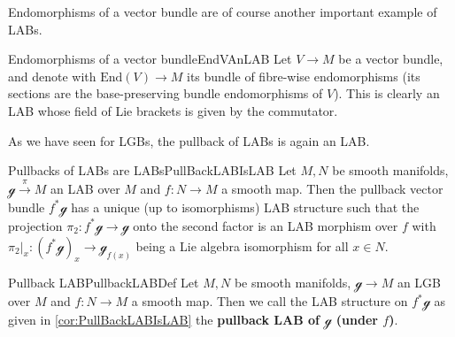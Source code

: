 \documentclass[reqno,a4paper,oneside]{amsart}
\theoremstyle{plain}
\theoremstyle{remark}
\theoremstyle{definition}
\begin{document}
Endomorphisms of a vector bundle are of course another important example of LABs.

\begin{examples}{Endomorphisms of a vector bundle}{EndVAnLAB}
Let $V \to M$ be a vector bundle, and denote with $\mathrm{End}(V) \to M$ its bundle of fibre-wise endomorphisms (its sections are the base-preserving bundle endomorphisms of $V$). This is clearly an LAB whose field of Lie brackets is given by the commutator.
\end{examples}

As we have seen for LGBs, the pullback of LABs is again an LAB.

\begin{corollaries}{Pullbacks of LABs are LABs}{PullBackLABIsLAB}
Let $M, N$ be smooth manifolds, $\mathcal{g} \stackrel{\pi}{\to} M$ an LAB over $M$ and $f \colon N \to M$ a smooth map. Then the pullback vector bundle $f^*\mathcal{g}$ has a unique (up to isomorphisms) LAB structure such that the projection $\pi_2\colon f^*\mathcal{g} \to \mathcal{g}$ onto the second factor is an LAB morphism over $f$ with $\pi_2|_x\colon (f^*\mathcal{g})_x \to \mathcal{g}_{f(x)}$ being a Lie algebra isomorphism for all $x \in N$.
%
\end{corollaries}


\begin{definitions}{Pullback LAB}{PullbackLABDef}
Let $M, N$ be smooth manifolds, $\mathcal{g} \to M$ an LGB over $M$ and $f: N \to M$ a smooth map. Then we call the LAB structure on $f^*\mathcal{g}$ as given in \ref{cor:PullBackLABIsLAB} the \textbf{pullback LAB of $\mathcal{g}$ (under $f$)}.
\end{definitions}
\end{document}
